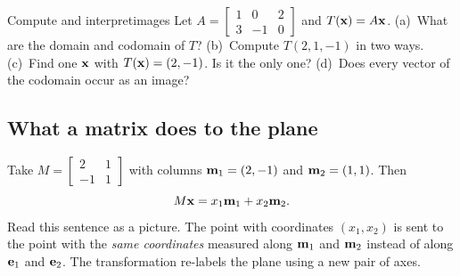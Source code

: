 \documentclass[11pt]{article}
\begin{document}
\begin{kc}{Compute and interpret}{images}
Let $A=\begin{bmatrix}1&0&2\\3&-1&0\end{bmatrix}$ and $T(\mathbf{x})=A\mathbf{x}$.
(a)~What are the domain and codomain of $T$? (b)~Compute $T(2,1,-1)$ in two ways. (c)~Find one $\mathbf{x}$ with $T(\mathbf{x})=(2,-1)$. Is it the only one? (d)~Does every vector of the codomain occur as an image?
\end{kc}

\subsection*{What a matrix does to the plane}

Take $M=\begin{bmatrix}2&1\\-1&1\end{bmatrix}$ with columns $\mathbf{m}_1=(2,-1)$ and $\mathbf{m}_2=(1,1)$. Then
\[
M\mathbf{x}=x_1\mathbf{m}_1+x_2\mathbf{m}_2 .
\]
Read this sentence as a picture. The point with coordinates $(x_1,x_2)$ is sent to the point with the \emph{same coordinates} measured along $\mathbf{m}_1$ and $\mathbf{m}_2$ instead of along $\mathbf{e}_1$ and $\mathbf{e}_2$. The transformation re-labels the plane using a new pair of axes.
\end{document}
